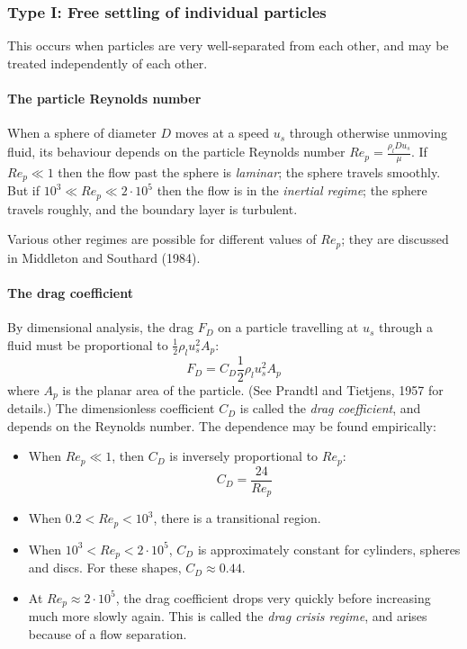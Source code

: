 \subsubsection{Type I: Free settling of individual particles} 

This occurs when particles are very well-separated from each other, and may be
treated independently of each other.

\paragraph{The particle Reynolds number} When a sphere of diameter $D$ moves at
a speed $u_s$ through otherwise unmoving fluid, its behaviour depends on the
particle Reynolds number $Re_p=\frac{\rho_lDu_s}{\mu}$.  If $Re_p\ll 1$ then the
flow past the sphere is \textit{laminar}; the sphere travels smoothly. But if
$10^3 \ll Re_p \ll 2\cdot10^5$ then the flow is in the \textit{inertial regime};
the sphere travels roughly, and the boundary layer is turbulent. 

Various other regimes are possible for different values of $Re_p$; they are
discussed in Middleton and Southard (1984). 

\paragraph{The drag coefficient} By dimensional analysis, the drag $F_D$ on a
particle travelling at $u_s$ through a fluid must be proportional to
$\frac{1}{2}\rho_lu_s^2A_p$:
\begin{equation}
 F_D = C_D\frac{1}{2}\rho_lu_s^2A_p
\end{equation}
where $A_p$ is the planar area of the particle. (See Prandtl and Tietjens, 1957
for details.) The dimensionless coefficient $C_D$ is called the \textit{drag
coefficient}, and depends on the Reynolds number. The dependence may be found
empirically:
\begin{itemize}
 \item When $Re_p\ll1$, then $C_D$ is inversely proportional to $Re_p$:
\begin{equation}
    C_D = \frac{24}{Re_p}
\end{equation}
 \item When $0.2 < Re_p < 10^3$, there is a transitional region.
 \item When $10^3 < Re_p < 2\cdot10^5$, $C_D$ is approximately constant for
     cylinders, spheres and discs. For these shapes, $C_D \approx 0.44$.
 \item At $Re_p\approx2\cdot10^5$, the drag coefficient drops very quickly before
     increasing much more slowly again. This is called the \textit{drag crisis
     regime}, and arises because of a flow separation.
\end{itemize}

